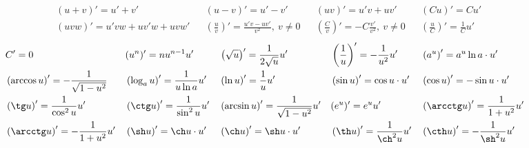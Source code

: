 



\small
\setlength{\abovedisplayskip}{0pt}
\setlength{\belowdisplayskip}{0pt}
\setlength{\abovedisplayshortskip}{0pt}
\setlength{\belowdisplayshortskip}{0pt}
\setlength{\parindent}{0pt}

\begin{align*}
	&(u+v)'=u'+v' & & (u-v)'=u'-v' & & (uv)'=u'v+uv' &  & (Cu)'=Cu'\\
	& (uvw)'=u'vw+uv'w+uvw' & & \left(\frac{u}{v}\right)' =\frac{u'v-uv'}{v^2},\ v\neq 0 & & \left(\frac{C}{v}\right)'=-C\frac{v'}{v^2},\ v\neq 0 & & \left(\frac{u}{C}\right)'=\frac{1}{C}u'
\end{align*}
\begin{align*}
	& C'=0 & & (u^n)'=nu^{n-1}u' & & \left(\sqrt{u}\right)'=\frac{1}{2\sqrt{u}}u' & & \left(\frac{1}{u}\right)'=-\frac{1}{u^2}u' & & \left(a^u\right)'=a^u\ln a\cdot u' \\
	& \left(\arccos u\right)'= -\frac{1}{\sqrt{1-u^2}} & & \left(\log_au\right)'=\frac{1}{u\ln a} u' & & \left(\ln u\right)'=\frac{1}{u}u' & & \left(\sin u\right)'=\cos u\cdot u' & & \left(\cos u\right)'=-\sin u\cdot u'\\
	& \left(\tg u\right)' = \frac{1}{\cos^2u}u' & &\left(\ctg u\right)' = \frac{1}{\sin^2u}u' & & \left(\arcsin u\right)' = \frac{1}{\sqrt{1-u^2}}u' & & (e^u)'=e^uu' & & \left(\arcctg u\right)' = \frac{1}{1+u^2}u'\\
	& \left(\arcctg u\right)'=-\frac{1}{1+u^2}u' & & \left(\sh u\right)' = \ch u \cdot u' & & \left(\ch u\right)' = \sh u\cdot u' & & \left(\th u\right)' = \frac{1}{\ch^2u}u' & & \left(\cth u\right)' = -\frac{1}{\sh^2u}u'
\end{align*}

